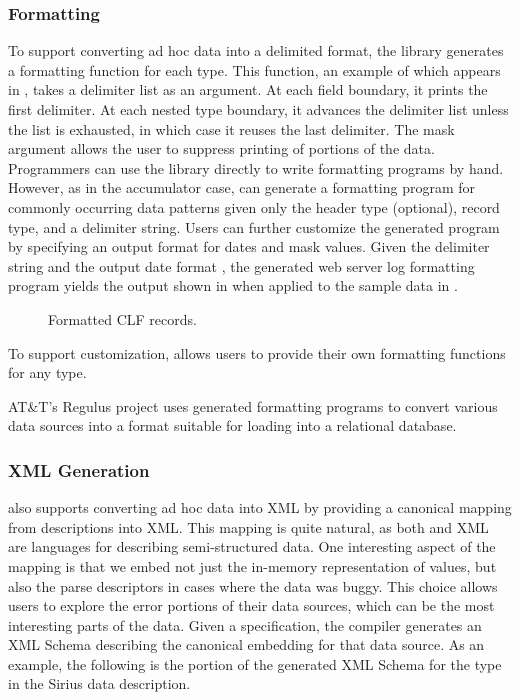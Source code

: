 \documentclass[times]{acm-sigplan}
\newcommand{\dibbler}{Sirius}
\newcommand{\darkstar}{Regulus}
\begin{document}
\subsubsection{Formatting}
To support converting ad hoc data into a delimited format, the \pads{}
library generates a formatting function for each type.  This function,
an example of which appears in , takes a delimiter
list as an argument.  At each field boundary, it prints the first delimiter.
At each nested type boundary, it advances the delimiter list unless the list
is exhausted, in which case it reuses the last delimiter.  The mask argument
allows the user to suppress printing of portions of the data.  Programmers
can use the library directly to write formatting programs by hand.  However, 
as in the accumulator case, \pads{} can generate a formatting program for 
commonly occurring data patterns given only the header type (optional), record type, and a delimiter string.  Users can further customize the generated program by specifying an output format for dates and mask values.   Given the delimiter
string  and the output date format , the generated
web server log formatting program yields
the output shown in  when applied to the
sample data in . 
\begin{figure*}
\begin{small}
\begin{center}
\begin{code}

\end{code}
\caption{Formatted CLF records.}
\label{figure:clf-records-formatted}
\end{center}
\end{small}
\end{figure*}
To support customization, \pads{} allows users to provide their own formatting functions for any type.

AT\&T's \darkstar{} project uses generated formatting programs to convert
various data sources into a format suitable for loading into a relational
database.

\subsubsection{XML Generation}
\pads{} also supports converting ad hoc data into XML by providing a canonical mapping from \pads{} descriptions into XML.  This mapping is quite natural, as both \pads{} and XML are languages for describing semi-structured data.
One interesting aspect of the mapping is that we embed not just the in-memory representation of \pads{} values, but also the parse descriptors in cases where the data was buggy.  This choice allows users to explore the error portions
of their data sources, which can be the most interesting parts of the data.
Given a \pads{} specification, the \pads{} compiler generates an XML Schema describing the canonical embedding for that data source.  As an example, 
the following is the portion of the generated XML Schema for the  type in the \dibbler{} data description.
\end{document}
